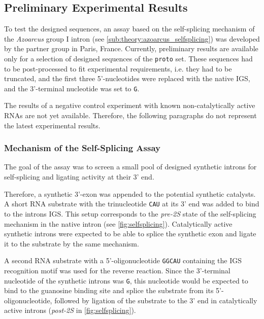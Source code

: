 \documentclass[../../master.tex]{subfiles}
\begin{document}
\subsection{Preliminary Experimental Results}
\label{sub:exp_results}

To test the designed sequences, an assay based on the self-splicing mechanism of the \textit{Azoarcus} group I intron (see \autoref{sub:theory:azoarcus_selfsplicing}) was developed by the partner group in Paris, France.
Currently, preliminary results are available only for a selection of designed sequences of the \texttt{proto} set.
These sequences had to be post-processed to fit experimental requirements, i.e. they had to be truncated, and the first three 5'-nucleotides were replaced with the native IGS, and the 3'-terminal nucleotide was set to \texttt{G}.

The results of a negative control experiment with known non-catalytically active RNAs are not yet available.
Therefore, the following paragraphs do not represent the latest experimental results.

\subsubsection{Mechanism of the Self-Splicing Assay}
\label{ssub:exp_results:assay}

The goal of the assay was to screen a small pool of designed synthetic introns for self-splicing and ligating activity at their 3' end.

Therefore, a synthetic 3'-exon was appended to the potential synthetic catalysts.
A short RNA substrate with the trinucleotide \texttt{CAU} at its 3' end was added to bind to the introns IGS.
This setup corresponds to the \emph{pre-2S} state of the self-splicing mechanism in the native intron (see \autoref{fig:selfsplicing}).
Catalytically active synthetic introns were expected to be able to splice the synthetic exon and ligate it to the substrate by the same mechanism.

A second RNA substrate with a 5'-oligonucleotide \texttt{GGCAU} containing the IGS recognition motif was used for the reverse reaction.
Since the 3'-terminal nucleotide of the synthetic introns was \texttt{G}, this nucleotide would be expected to bind to the guanosine binding site and splice the substrate from its 5'-oligonucleotide, followed by ligation of the substrate to the 3' end in catalytically active introns (\emph{post-2S} in \autoref{fig:selfsplicing}).
\end{document}
